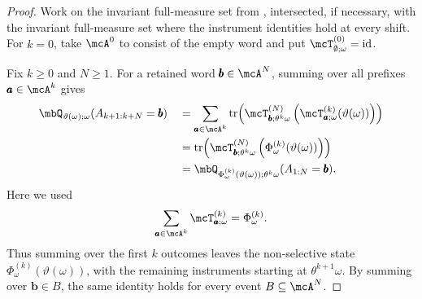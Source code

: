 \documentclass[a4paper]{article}
\numberwithin{equation}{section}   %
\theoremstyle{plain}   %
\theoremstyle{plain}   %
\theoremstyle{examplestyle}
\DeclareMathOperator{\str}{tr} %
\begin{document}
\begin{proof}
    Work on the invariant full-measure set from , intersected, if necessary, with the invariant full-measure set where the instrument identities hold at every shift.
    For $k=0$, take $\mcA^0$ to consist of the empty word and put $\mcT^{(0)}_{\emptyset;\omega}=\mathrm{id}$.
    
    Fix $k\ge0$ and $N\ge1$.
    For a retained word $\pmb b\in\mcA^N$, summing over all  prefixes $\pmb a\in\mcA^k$ gives
    \begin{align*}
        \mbQ_{\vartheta(\omega);\omega}
            (A_{k+1:k+N}=\pmb b)
        &\quad=
        \sum_{\pmb a\in\mcA^k}
        \str\!\left(
                \mcT^{(N)}_{\pmb b;\theta^k\omega}
        \left(
            \mcT^{(k)}_{\pmb a;\omega}
                (\vartheta(\omega))
        \right)
            \right)\\
        &\quad=
        \str\!\left(
            \mcT^{(N)}_{\pmb b;\theta^k\omega}
            \left(
                \Phi^{(k)}_\omega(\vartheta(\omega))
            \right)
        \right)\\
        &\quad=
        \mbQ_{\Phi^{(k)}_\omega(\vartheta(\omega));\theta^k\omega}
            (A_{1:N}=\pmb b).
    \end{align*}
    Here we used
    \[
        \sum_{\pmb a\in\mcA^k}
            \mcT^{(k)}_{\pmb a;\omega}
        =\Phi^{(k)}_\omega.
    \]
    Thus summing over the first $k$ outcomes leaves the non-selective state $\Phi^{(k)}_\omega(\vartheta(\omega))$, with the remaining instruments starting at $\theta^{k+1}\omega$.
    By summing over $\pmb b\in B$, the same identity holds for every event $B\subseteq\mcA^N$.


\end{proof}
\end{document}
